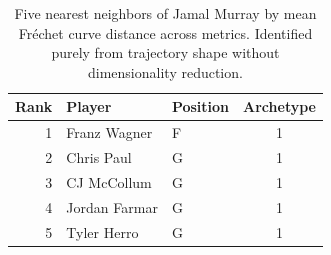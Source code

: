\begin{table}[htbp]
  \centering\small
  \begin{tabular}{rllc}
    \toprule
    Rank & Player & Position & Archetype \\
    \midrule
    1 & Franz Wagner & F & 1 \\
    2 & Chris Paul & G & 1 \\
    3 & CJ McCollum & G & 1 \\
    4 & Jordan Farmar & G & 1 \\
    5 & Tyler Herro & G & 1 \\
    \bottomrule
  \end{tabular}
  \caption{Five nearest neighbors of Jamal Murray by mean Fr\'{e}chet curve distance across metrics. Identified purely from trajectory shape without dimensionality reduction.}
  \label{tab:Jamal_Murray_frechet_curve_neighbors}
\end{table}

